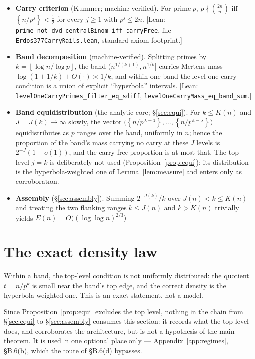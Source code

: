 \documentclass[11pt]{article}
\theoremstyle{definition}
\theoremstyle{plain}
\newcommand{\fl}[1]{\left\lfloor #1\right\rfloor}
\newcommand{\fpart}[1]{\left\{#1\right\}}
\begin{document}
\begin{itemize}
\item[(K)] \textbf{Carry criterion} (Kummer; machine-verified).  For prime
$p$, $p\nmid\binom{2n}{n}$ iff $\fpart{n/p^j}<\tfrac12$ for every $j\ge1$
with $p^j\le 2n$.  [Lean: \texttt{prime\_not\_dvd\_centralBinom\_iff\_carryFree},
file \texttt{Erdos377CarryRails.lean}, standard axiom footprint.]
\item[(B)] \textbf{Band decomposition} (machine-verified).  Splitting primes
by $k=\fl{\log n/\log p}$, the band $(n^{1/(k+1)},n^{1/k}]$ carries Mertens
mass $\log(1+1/k)+O(\cdot)\asymp1/k$, and within one band the level-one
carry condition is a union of explicit ``hyperbola'' intervals.
[Lean: \texttt{levelOneCarryPrimes\_filter\_eq\_sdiff},
\texttt{levelOneCarryMass\_eq\_band\_sum}.]
\item[(E)] \textbf{Band equidistribution} (the analytic core; \S\ref{sec:equi}).
For $k\le K(n)$ and $J=J(k)\to\infty$ slowly, the vector
$\bigl(\fpart{n/p^{\,k-1}},\dots,\fpart{n/p^{\,k-J}}\bigr)$ equidistributes
as $p$ ranges over the band, uniformly in $n$; hence the proportion of the
band's mass carrying no carry at these $J$ levels is $2^{-J}(1+o(1))$, and
the carry-free proportion is at most that.  The top level $j=k$ is
deliberately not used (Proposition~\ref{prop:equi}); its distribution is
the hyperbola-weighted one of Lemma~\ref{lem:measure} and enters only as
corroboration.
\item[(A)] \textbf{Assembly} (\S\ref{sec:assembly}).  Summing
$2^{-J(k)}/k$ over $J(n)<k\le K(n)$ and treating the two flanking ranges
$k\le J(n)$ and $k>K(n)$ trivially yields
$E(n)=O\bigl((\log\log n)^{2/3}\bigr)$.
\end{itemize}

\section{The exact density law}\label{sec:density}

Within a band, the top-level condition is not uniformly distributed: the
quotient $t=n/p^k$ is small near the band's top edge, and the correct
density is the hyperbola-weighted one.  This is an exact statement, not a
model.

Since Proposition~\ref{prop:equi} excludes the top level, nothing in the
chain from \S\ref{sec:equi} to \S\ref{sec:assembly} consumes this
section: it records what the top level does, and corroborates the
architecture, but is not a hypothesis of the main theorem.  It is used
in one optional place only --- Appendix~\ref{app:regimes}, \S B.6(b),
which the route of \S B.6(d) bypasses.
\end{document}
